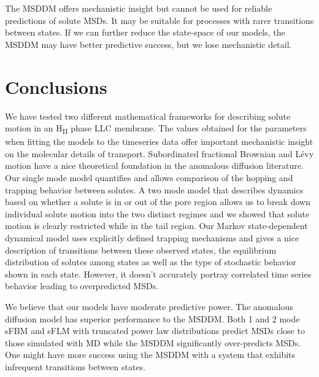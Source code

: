 \documentclass{article}
\begin{document}
  The MSDDM offers mechanistic insight but cannot be used for reliable predictions
  of solute MSDs. It may be suitable for processes with rarer transitions between 
  states. If we can further reduce the state-space of our models, the MSDDM
  may have better predictive success, but we lose mechanistic detail.
  

  \section{Conclusions}

  
  We have tested two different mathematical frameworks for describing solute
  motion in an H\textsubscript{II} phase LLC membrane. 
  The values obtained for the parameters when fitting the models to the timeseries data  
  offer important mechanistic insight on the molecular details of transport.
  Subordinated fractional Brownian and L\'evy motion have a nice theoretical 
  foundation in the anomalous diffusion literature. Our single mode model
  quantifies and allows comparison of the hopping and trapping behavior 
  between solutes. A two mode model that describes dynamics based on whether
  a solute is in or out of the pore region allows us to break down individual
  solute motion into the two distinct regimes and we showed that solute motion is
  clearly restricted while in the tail region. Our Markov state-dependent dynamical
  model uses explicitly defined trapping mechanisms and gives a nice description 
  of transitions between these observed states, the equilibrium distribution of 
  solutes among states as well as the type of stochastic behavior shown in each 
  state. However, it doesn't accurately portray correlated time series behavior
  leading to overpredicted MSDs.
  
  We believe that our models have moderate predictive power. 
  The anomalous
  diffusion model has superior performance to the MSDDM. Both 1 and 2 mode 
  sFBM and sFLM with truncated power law distributions predict MSDs close 
  to those simulated with MD while the MSDDM significantly over-predicts MSDs.
  One might have more success using the MSDDM with a system that exhibits
  infrequent transitions between states.
\end{document}
